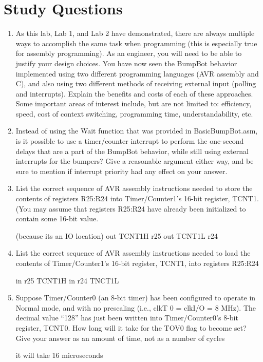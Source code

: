 \documentclass[12pt,letterpaper]{article}
\begin{document}
\section{Study Questions}
\begin{enumerate}
    \item
    As this lab, Lab 1, and Lab 2 have demonstrated, there are always multiple ways to accomplish the same task when programming (this is especially true for assembly programming). As an engineer, you will need to be able to justify your design choices. You have now seen the BumpBot behavior implemented using two different programming languages (AVR assembly and C), and also using two different methods of receiving external input (polling and interrupts).
    Explain the benefits and costs of each of these approaches. Some important areas of interest include, but are not limited to: efficiency, speed, cost of context switching, programming time, understandability, etc.
    
    
    \item 
    Instead of using the Wait function that was provided in BasicBumpBot.asm, is it possible to use a timer/counter interrupt to perform the one-second delays that are a part of the BumpBot behavior, while still using external
    interrupts for the bumpers? Give a reasonable argument either way, and be sure to mention if interrupt priority had any effect on your answer.
    
    
    \item 
    List the correct sequence of AVR assembly instructions needed to store the contents of registers R25:R24 into Timer/Counter1’s 16-bit register, TCNT1. (You may assume that registers R25:R24 have already been initialized to contain some 16-bit value.
    
 	
    (because its an IO location)
    out TCNT1H r25
    out TCNT1L r24
    
    \item
    List the correct sequence of AVR assembly instructions needed to load the contents of Timer/Counter1’s 16-bit register, TCNT1, into registers R25:R24
    
    in r25 TCNT1H
    in r24 TNCT1L
    
    \item 
    Suppose Timer/Counter0 (an 8-bit timer) has been configured to operate in Normal mode, and with no prescaling (i.e., clkT 0 = clkI/O = 8 MHz). The decimal value “128” has just been written into Timer/Counter0’s 8-bit
    register, TCNT0. How long will it take for the TOV0 flag to become set? Give your answer as an amount of time, not as a number of cycles
    
    it will take 16 microseconds
    
    
\end{enumerate}
\end{document}
